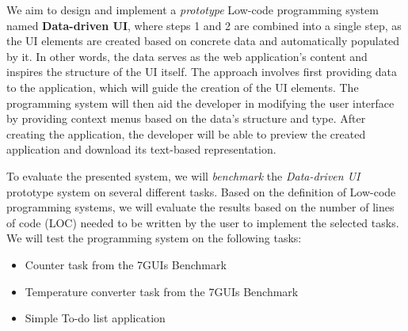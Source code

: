 We aim to design and implement a \emph{prototype} Low-code programming system named \textbf{Data-driven UI}, where steps 1 and 2 are combined into a single step, as the UI elements are created based on concrete data and automatically populated by it.
In other words, the data serves as the web application's content and inspires the structure of the UI itself.
The approach involves first providing data to the application, which will guide the creation of the UI elements.
The programming system will then aid the developer in modifying the user interface by providing context menus based on the data's structure and type.
After creating the application, the developer will be able to preview the created application and download its text-based representation.

\newpage
To evaluate the presented system, we will \emph{benchmark} the \emph{Data-driven UI} prototype system on several different tasks.
Based on the definition of Low-code programming systems, we will evaluate the results based on the number of lines of code (LOC) needed to be written by the user to implement the selected tasks.
We will test the programming system on the following tasks:
\begin{itemize}
	\item Counter task from the 7GUIs Benchmark
	\item Temperature converter task from the 7GUIs Benchmark
	\item Simple To-do list application
\end{itemize}



\newpage
